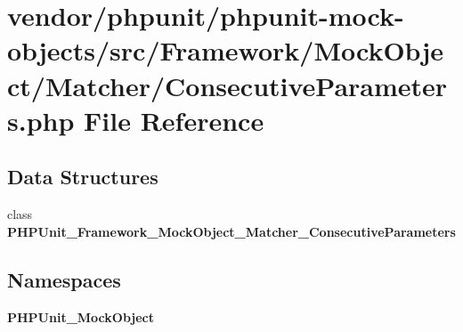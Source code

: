 \section{vendor/phpunit/phpunit-\/mock-\/objects/src/\+Framework/\+Mock\+Object/\+Matcher/\+Consecutive\+Parameters.php File Reference}
\label{_consecutive_parameters_8php}
\subsection*{Data Structures}
\begin{DoxyCompactItemize}
\item 
class {\bf P\+H\+P\+Unit\+\_\+\+Framework\+\_\+\+Mock\+Object\+\_\+\+Matcher\+\_\+\+Consecutive\+Parameters}
\end{DoxyCompactItemize}
\subsection*{Namespaces}
\begin{DoxyCompactItemize}
\item 
 {\bf P\+H\+P\+Unit\+\_\+\+Mock\+Object}
\end{DoxyCompactItemize}
